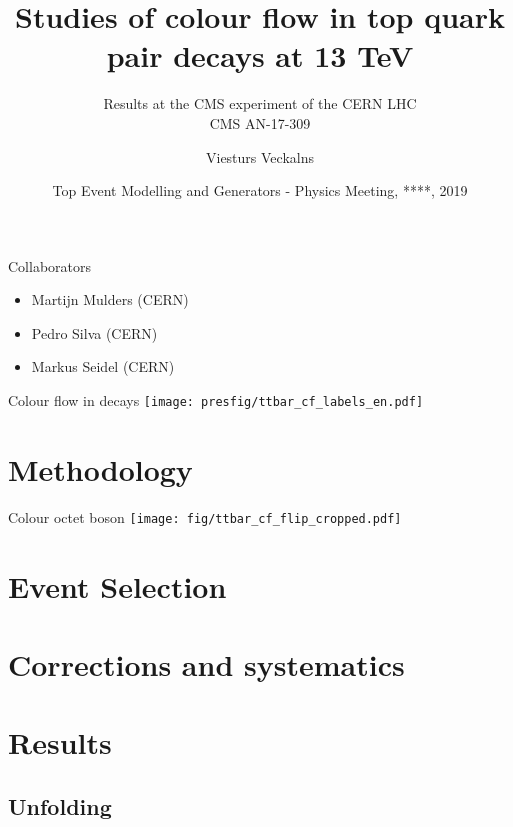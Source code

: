 \documentclass{beamer}
\title{Studies of colour flow in top quark pair decays at 13 TeV}
\subtitle{Results at the CMS experiment of the CERN LHC\\\vspace{0.5cm}CMS AN-17-309}
\author{Viesturs Veckalns}
\institute{Rīgas Tehniskā universitāte}
\date{Top Event Modelling and Generators - Physics Meeting, ****, 2019}
\def\RTUpresdef{\string~/RTUpresdef}
\begin{document}
{
  \logo{}
  \begin{frame}
  \end{frame}
}

\begin{frame}{Collaborators}
  \begin{itemize}
    \item Martijn Mulders (CERN)
    \item Pedro Silva (CERN)
    \item Markus Seidel (CERN)
  \end{itemize}
\end{frame}

\begin{frame}{Colour flow in \ttbar decays}
  \centering
    \texttt{[image: presfig/ttbar\_cf\_labels\_en.pdf]}
\end{frame}

\section{Methodology}


\begin{frame}{Colour octet \PW boson}
  \centering
  \texttt{[image: fig/ttbar\_cf\_flip\_cropped.pdf]}
\end{frame}

\section{Event Selection}


\section{Corrections and systematics}


\section{Results}


\subsection{Unfolding}

\end{document}
